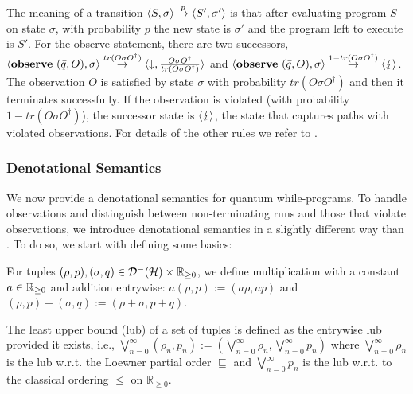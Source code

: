 \documentclass[a4paper,UKenglish,cleveref, autoref, thm-restate]{lipics-v2021}
\begin{document}
The meaning of a transition $\langle S , \sigma \rangle \overset{p}{\rightarrow} \langle S' , \sigma' \rangle$ is that after evaluating program $S$ on state $\sigma$, with probability $p$ the new state is $\sigma'$ and the program left to execute is $S'$. For the observe statement, there are two successors, $\langle \mathbf{observe } \text{ }(\Bar{q},O) , \sigma \rangle \overset{tr(O \sigma O^\dagger)}{\rightarrow} \langle \downarrow , \frac{O\sigma O ^\dagger}{tr(O \sigma O^\dagger)} \rangle$ and $\langle \mathbf{observe } \text{ }(\Bar{q},O) , \sigma \rangle\overset{1-tr(O \sigma O^\dagger)}{\rightarrow} \langle \lightning \rangle$. The observation $O$ is satisfied by state $\sigma$ with probability $tr(O \sigma O^\dagger)$ and then it terminates successfully. If the observation is violated (with probability $1-tr(O \sigma O^\dagger)$), the successor state is $\langle \lightning \rangle$, the state that captures paths with violated observations.
For details of the other rules we refer to \cite{floydHoareLogic}.

\subsubsection{Denotational Semantics}
We now provide a denotational semantics for quantum while-programs. To handle observations and distinguish between non-terminating runs and those that violate observations, we introduce denotational semantics in a slightly different way than \cite{floydHoareLogic}. To do so, we start with defining some basics:

For tuples $(\rho,p), (\sigma,q) \in \mathcal{D}^- (\mathcal{H}) \times \mathbb{R}_{\geq 0}$, we define multiplication with a constant $a \in \mathbb{R}_{\geq 0}$ and addition entrywise: $
    a(\rho,p) := (a \rho, a p)$ and $
    (\rho,p)+(\sigma,q) := (\rho+\sigma, p+q)$.

The least upper bound (lub) of a set of tuples is defined as the entrywise lub provided it exists, i.e., $\bigvee_{n=0}^\infty (\rho_n,p_n):= (\bigvee_{n=0}^\infty \rho_n, \bigvee_{n=0}^\infty p_n)$ where $\bigvee_{n=0}^\infty \rho_n$ is the lub w.r.t. the Loewner partial order $\sqsubseteq$ and $\bigvee_{n=0}^\infty p_n$ is the lub w.r.t. to the classical ordering $\leq$ on $\mathbb{R}_{\geq 0}$.
\end{document}
